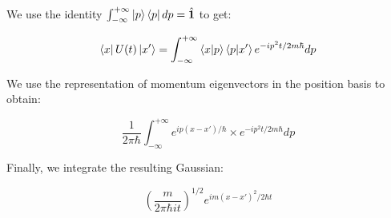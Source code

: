 
We use the identity $\int_{-\infty}^{+\infty} \ket{p}\bra{p} dp = \hat{\textbf{1}}$ to get:

\begin{equation}
   \bra{x} U(t) \ket{x'} = \int_{-\infty}^{+\infty} \braket{x}{p}\braket{p}{x'} e^{-ip^2t/2m\hbar} dp
\end{equation}

We use the representation of momentum eigenvectors in the position basis to obtain:

\begin{equation}
   \frac{1}{2 \pi \hbar} \int_{-\infty}^{+\infty} e^{ip(x-x')/\hbar} \times e^{-ip^2t/2m\hbar} dp
\end{equation}

Finally, we integrate the resulting Gaussian:

\begin{equation}
   (\frac{m}{2 \pi \hbar i t})^{1/2} e^{im(x-x')^2/2 \hbar t}
\end{equation}
